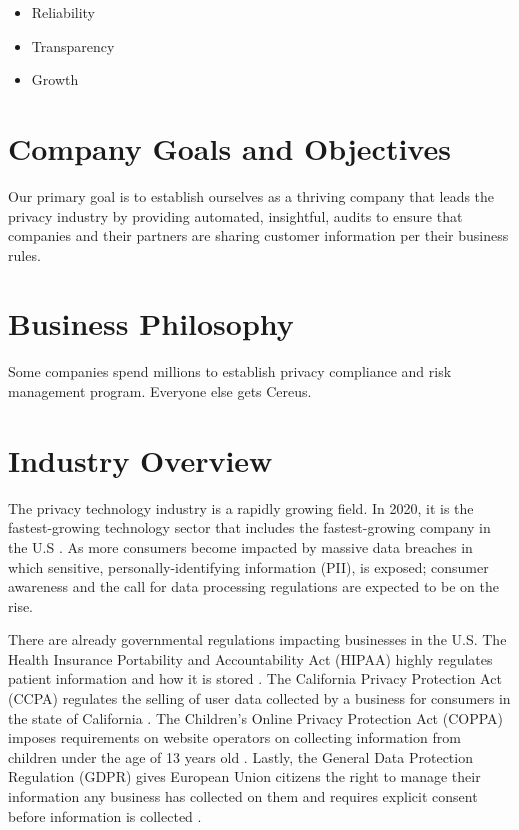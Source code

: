 \begin{itemize}
  \item Reliability
  \item Transparency
  \item Growth
\end{itemize}

\section{Company Goals and Objectives}

Our primary goal is to establish ourselves as a thriving company that leads the privacy industry by providing automated, insightful, audits to ensure that companies and their partners are sharing customer information per their business rules.

\section{Business Philosophy}

Some companies spend millions to establish privacy compliance and risk management program. Everyone else gets Cereus.

\section{Industry Overview}

The privacy technology industry is a rapidly growing field. In 2020, it is the fastest-growing technology sector that includes the fastest-growing company in the U.S \cite{hughes.iapp.2020}. As more consumers become impacted by massive data breaches in which sensitive, personally-identifying information (PII), is exposed; consumer awareness and the call for data processing regulations are expected to be on the rise.

There are already governmental regulations impacting businesses in the U.S. The Health Insurance Portability and Accountability Act (HIPAA) highly regulates patient information and how it is stored \cite{cdc.2018}. The California Privacy Protection Act (CCPA) regulates the selling of user data collected by a business for consumers in the state of California \cite{calleg.2018}. The Children's Online Privacy Protection Act (COPPA) imposes requirements on website operators on collecting information from children under the age of 13 years old \cite{ftc.1998}. Lastly, the General Data Protection Regulation (GDPR) gives European Union citizens the right to manage their information any business has collected on them and requires explicit consent before information is collected \cite{eucomm.2016}.

